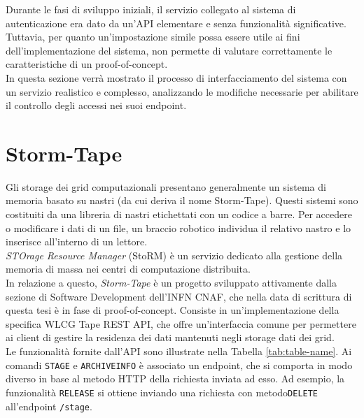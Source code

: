 Durante le fasi di sviluppo iniziali, il servizio collegato al sistema di autenticazione era dato da un'API
elementare e senza funzionalità significative.
\\ Tuttavia, per quanto un'impostazione simile possa essere utile ai fini dell'implementazione del sistema, non 
permette di valutare correttamente le caratteristiche di un proof-of-concept.
\\ In questa sezione verrà mostrato il processo di interfacciamento del sistema con un servizio 
realistico e complesso, analizzando le modifiche necessarie per abilitare il controllo degli accessi
nei suoi endpoint. 

\section{Storm-Tape}
Gli storage dei grid computazionali presentano generalmente un sistema di memoria basato su nastri (da cui deriva il nome Storm-Tape). 
Questi sistemi sono costituiti da una libreria di nastri etichettati con un codice a barre. Per accedere o modificare i dati di un file, 
un braccio robotico individua il relativo nastro e lo inserisce all'interno di un lettore.
\\ \textit{STOrage Resource Manager} (StoRM) è un servizio dedicato alla gestione della memoria 
di massa nei centri di computazione distribuita. \\ In relazione a questo, \textit{Storm-Tape} è un progetto sviluppato
 attivamente dalla sezione di Software Development dell'INFN CNAF, che nella data di scrittura di questa tesi è in fase di proof-of-concept.
Consiste in un'implementazione della specifica {WLCG Tape REST API}, che offre un'interfaccia comune per permettere 
ai client di gestire la residenza dei dati mantenuti negli storage dati dei grid. 
\\ Le funzionalità fornite dall'API sono illustrate nella Tabella \ref*{tab:table-name}. Ai comandi \texttt{STAGE} e \texttt{ARCHIVEINFO} è associato un endpoint,
 che si comporta in modo diverso in base al metodo HTTP della richiesta inviata ad esso. Ad esempio, la funzionalità \texttt{RELEASE}
  si ottiene inviando una richiesta con metodo\texttt{DELETE} all'endpoint \texttt{/stage}.

